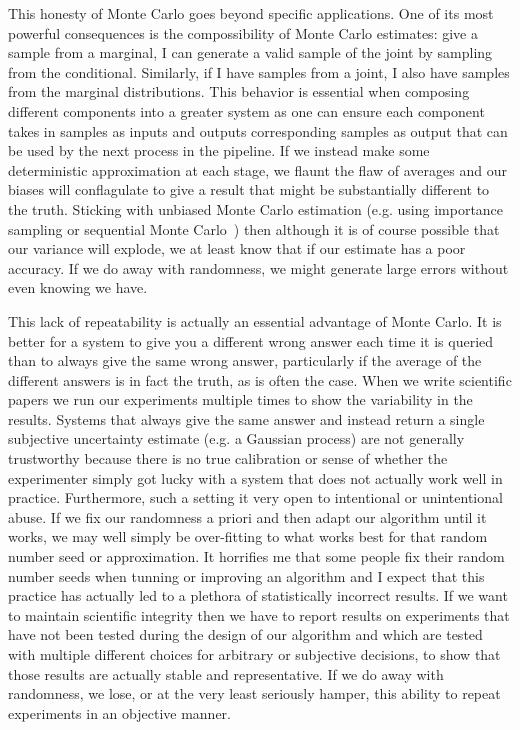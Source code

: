 This honesty of Monte Carlo goes beyond specific applications.  One of its most powerful consequences is the compossibility
of Monte Carlo estimates: give a sample from a marginal, I can generate a valid sample of the joint by sampling from the
conditional.  Similarly, if I have samples from a joint, I also have samples from the marginal distributions.  This behavior
is essential when composing different components into a greater system as one can ensure each component takes in
samples as inputs and outputs corresponding samples as output that can be used by the next process in the pipeline.
If we instead make some deterministic approximation at each stage, we flaunt the flaw of averages and our biases
will conflagulate to give a result that might be substantially different to the truth.  Sticking with unbiased Monte Carlo estimation
(e.g. using importance sampling or sequential Monte Carlo~\citep{doucet2009tutorial}) then although it is of course possible that our 
variance will explode, we at least know that if our estimate has a poor accuracy.  If we do away with randomness,
we might generate large errors without even knowing we have.

This lack of repeatability is actually an essential advantage of Monte Carlo.  It is better for a system to give you
a different wrong answer each time it is queried than to always give the same wrong answer, particularly if the average
of the different answers is in fact the truth, as is often the case.  When we write scientific papers we run our experiments
multiple times to show the variability in the results.  Systems that always give the same answer and instead return
a single subjective uncertainty estimate (e.g. a Gaussian process) are not generally trustworthy because there is no
true calibration or sense of whether the experimenter simply got lucky with a system that does not actually work well
in practice.  Furthermore, such a setting it very open to intentional or unintentional abuse.  If we fix our randomness
a priori and then adapt our algorithm until it works, we may well simply be over-fitting to what works best for that
random number seed or approximation.  It horrifies me that some people fix their random number seeds when 
tunning or improving an algorithm and I expect that this practice has actually led to a plethora of statistically incorrect
results.  If we want to maintain scientific integrity then we have to report results on experiments that have not been
tested during the design of our algorithm and which are tested with multiple different choices for arbitrary or subjective
decisions, to show that those results are actually stable and representative.  If we do away with randomness, we lose, or at the very least
seriously hamper, this ability to repeat experiments in an objective manner.

